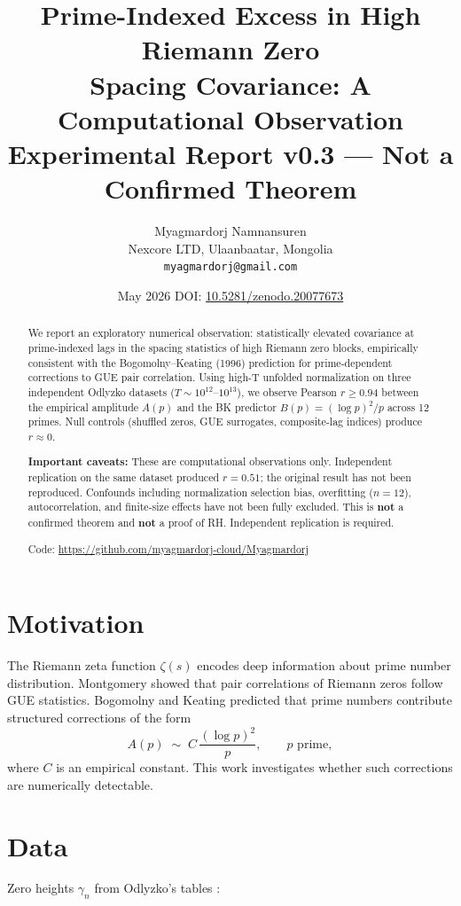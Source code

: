 \documentclass[11pt]{article}
\title{%
  Prime-Indexed Excess in High Riemann Zero\\
  Spacing Covariance: A Computational Observation\\[0.5em]
  \large\normalfont Experimental Report v0.3 --- Not a Confirmed Theorem
}
\author{%
  Myagmardorj Namnansuren\\
  \small Nexcore LTD, Ulaanbaatar, Mongolia\\
  \small \texttt{myagmardorj@gmail.com}
}
\date{May 2026 \quad DOI: \href{https://zenodo.org/records/20077673}{10.5281/zenodo.20077673}}
\begin{document}
\maketitle

\begin{abstract}
We report an exploratory numerical observation: statistically elevated
covariance at prime-indexed lags in the spacing statistics of high
Riemann zero blocks, empirically consistent with the
Bogomolny--Keating (1996) prediction for prime-dependent corrections
to GUE pair correlation. Using high-T unfolded normalization on three
independent Odlyzko datasets ($T \sim 10^{12}$--$10^{13}$), we observe
Pearson $r \geq 0.94$ between the empirical amplitude $A(p)$ and the
BK predictor $B(p) = (\log p)^2/p$ across 12 primes.
Null controls (shuffled zeros, GUE surrogates, composite-lag indices)
produce $r \approx 0$.

\medskip\noindent\textbf{Important caveats:}
These are computational observations only. Independent replication on the same dataset produced $r = 0.51$; the original result has not been reproduced.
Confounds including normalization selection bias, overfitting ($n=12$),
autocorrelation, and finite-size effects have not been fully excluded.
This is \textbf{not} a confirmed theorem and \textbf{not} a proof of RH.
Independent replication is required.

\medskip\noindent Code: \url{https://github.com/myagmardorj-cloud/Myagmardorj}
\end{abstract}

\section{Motivation}

The Riemann zeta function $\zeta(s)$ encodes deep information about
prime number distribution. Montgomery \cite{montgomery1973} showed that
pair correlations of Riemann zeros follow GUE statistics.
Bogomolny and Keating \cite{bk1996} predicted that prime numbers
contribute structured corrections of the form
\[
  A(p) \;\sim\; C \,\frac{(\log p)^2}{p}, \qquad p \text{ prime},
\]
where $C$ is an empirical constant. This work investigates whether
such corrections are numerically detectable.

\section{Data}

Zero heights $\gamma_n$ from Odlyzko's tables \cite{odlyzko}:
\end{document}
